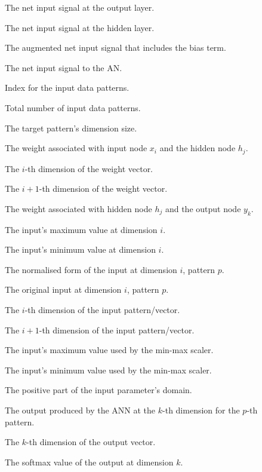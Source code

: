 \begin{description}
	\item [\parbox{2cm}{$net_{h,y}$}] \parbox{12.5cm}{The net input signal at the output layer.}
	\item [\parbox{2cm}{$net_{i,h}$}] \parbox{12.5cm}{The net input signal at the hidden layer.}
	\item [\parbox{2cm}{$net^{'}$}] \parbox{12.5cm}{The augmented net input signal that includes the bias term.}
	\item [\parbox{2cm}{$net$}] \parbox{12.5cm}{The net input signal to the \acs{AN}.}
	\item [\parbox{2cm}{$p$}] \parbox{12.5cm}{Index for the input data patterns.}
	\item [\parbox{2cm}{$P$}] \parbox{12.5cm}{Total number of input data patterns.}
	\item [\parbox{2cm}{$T$}] \parbox{12.5cm}{The target pattern's dimension size.}
	\item [\parbox{2cm}{$v_{i,j}$}] \parbox{12.5cm}{The weight associated with input node $x_{i}$ and the hidden node $h_{j}$.}
	\item [\parbox{2cm}{$v_{i}$}] \parbox{12.5cm}{The $i$-th dimension of the weight vector.}
	\item [\parbox{2cm}{$v_{i+1}$}] \parbox{12.5cm}{The $i+1$-th dimension of the weight vector.}
	\item [\parbox{2cm}{$w_{j,k}$}] \parbox{12.5cm}{The weight associated with hidden node $h_{j}$ and the output node $y_{k}$.}
	\item [\parbox{2cm}{$x_{i_{max}}$}] \parbox{12.5cm}{The input's maximum value at dimension $i$.}
	\item [\parbox{2cm}{$x_{i_{min}}$}] \parbox{12.5cm}{The input's minimum value at dimension $i$.}
	\item [\parbox{2cm}{$x_{i,p}^{'}$}] \parbox{12.5cm}{The normalised form of the input at dimension $i$, pattern $p$.}
	\item [\parbox{2cm}{$x_{i,p}$}] \parbox{12.5cm}{The original input at dimension $i$, pattern $p$.}
	\item [\parbox{2cm}{$x_{i}$}] \parbox{12.5cm}{The $i$-th dimension of the input pattern/vector.}
	\item [\parbox{2cm}{$x_{i+1}$}] \parbox{12.5cm}{The $i+1$-th dimension of the input pattern/vector.}
	\item [\parbox{2cm}{$x_{max}$}] \parbox{12.5cm}{The input's maximum value used by the min-max scaler.}
	\item [\parbox{2cm}{$x_{min}$}] \parbox{12.5cm}{The input's minimum value used by the min-max scaler.}
	\item [\parbox{2cm}{$x^{+}$}] \parbox{12.5cm}{The positive part of the input parameter's domain.}
	\item [\parbox{2cm}{$y_{k,p}$}] \parbox{12.5cm}{The output produced by the \acs{ANN} at the $k$-th dimension for the $p$-th pattern.}
	\item [\parbox{2cm}{$y_{k}$}] \parbox{12.5cm}{The $k$-th dimension of the output vector.}
	\item [\parbox{2cm}{$y^{'}_k$}] \parbox{12.5cm}{The softmax value of the output at dimension $k$.}

\end{description}

